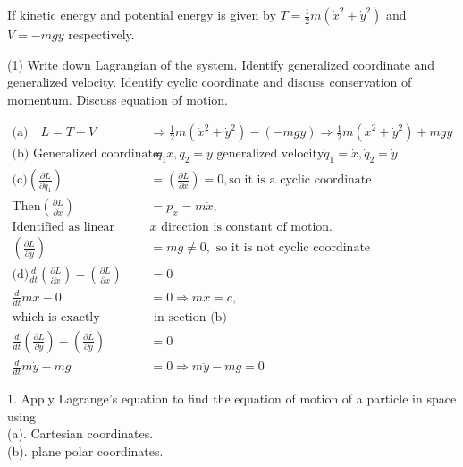 \begin{exercise}
If kinetic energy and potential energy is given by $T=\frac{1}{2} m\left(\dot{x}^{2}+\dot{y}^{2}\right)$ and $V=-m g y$ respectively.
	 \begin{tasks}(1)
		\task[\textbf{a.}] Write down Lagrangian of the system.
		\task[\textbf{b.}] Identify generalized coordinate and generalized velocity.
		\task[\textbf{c.}] Identify cyclic coordinate and discuss conservation of momentum.
		\task[\textbf{d.}]  Discuss equation of motion.
	\end{tasks}
\end{exercise}
\begin{answer}
\begin{align*}
\text{(a)} \quad L=T-V &\Rightarrow \frac{1}{2} m\left(\dot{x}^{2}+\dot{y}^{2}\right)-(-m g y) \Rightarrow \frac{1}{2} m\left(\dot{x}^{2}+\dot{y}^{2}\right)+m g y\\
\text{(b)} \text{ Generalized coordinate }q_{1}&=x, q_{2}=y\text{ generalized velocity} \dot{q}_{1}=\dot{x}, \dot{q}_{2}=\dot{y}\\
\text{(c)} \left(\frac{\partial L}{\partial q_{1}}\right)&=\left(\frac{\partial L}{\partial x}\right)=0, \text{so it is a cyclic coordinate}\\ 
\text{Then} \left(\frac{\partial L}{\partial \dot{x}}\right)&=p_{x}=m \dot{x},\\ \text{Identified as linear momentum in }&\text{$x$ direction is constant of motion.}\\
\left(\frac{\partial L}{\partial y}\right)&=m g \neq 0,\text{ so it is not cyclic coordinate}\\
\text{(d)} \frac{d}{d t}\left(\frac{\partial L}{\partial \dot{x}}\right)-\left(\frac{\partial L}{\partial x}\right)&=0 \\
\frac{d}{d t} m \dot{x}-0&=0 \Rightarrow m \dot{x}=c,\\
 \text{which is exactly explained} &\text{ in section (b)}\\
\frac{d}{d t}\left(\frac{\partial L}{\partial \dot{y}}\right)-\left(\frac{\partial L}{\partial y}\right)&=0 \\
 \frac{d}{d t} m \dot{y}-m g&=0 \Rightarrow m \ddot{y}-m g=0
\end{align*}
\end{answer}
\begin{exercise}
	1. Apply Lagrange's equation to find the equation of motion of a particle in space using \\
	(a). Cartesian coordinates. \\
	(b). plane polar coordinates.
\end{exercise}
